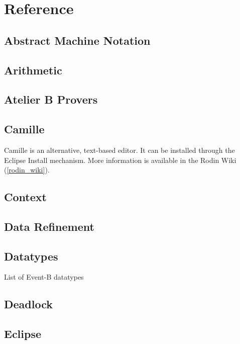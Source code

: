 \chapter{Reference}
\label{reference}

\section{Abstract Machine Notation}
\label{abstract_machine_notation}

\section{Arithmetic}
\label{arithmetic}

\section{Atelier B Provers}
\label{atelier_b_provers}

\section{Camille}
\label{camille}

Camille is an alternative, text-based editor.  It can be installed through the Eclipse Install mechanism.  More information is available in the Rodin Wiki (\ref{rodin_wiki}).

\section{Context}
\label{context}

\section{Data Refinement}
\label{data_refinement}

\section{Datatypes}
\label{datatypes}

List of Event-B datatypes

\section{Deadlock}
\label{deadlock}

\section{Eclipse}
\label{eclipse}

